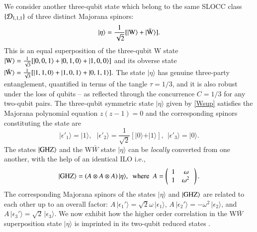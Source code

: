 We consider another three-qubit state which belong to the same SLOCC class $\{{\cal D}_{1,1,1}\}$ of three distinct Majorana spinors: 
\begin{equation}
\vert \eta\rangle = \frac{1}{\sqrt{2}} [\vert {\rm W}\rangle +  \vert{\rm \bar{W}}\rangle].\label{Wsup}
\end{equation}         
This  is an equal superposition of the three-qubit W state $\vert{\rm W}\rangle=\break\frac{1}{\sqrt{3}}[\vert 0,0,1\rangle+\vert 0,1,0\rangle+\vert 1,0,0\rangle]$  
 and its obverse state $\vert{\rm \bar{W}}\rangle=\frac{1}{\sqrt{3}}[\vert 1,1,0\rangle+\vert 1,0,1\rangle+\vert 0,1,1\rangle].$ The state $\vert \eta\rangle$ has genuine three-party entanglement, quantified in terms of the tangle $\tau=1/3$, and it is also robust under the loss of qubits -- as reflected through the concurrence $C=1/3$ for any two-qubit pairs.  The three-qubit symmetric state $\vert \eta\rangle$ given by \eqref{Wsup} satisfies the Majorana polynomial equation $z(z-1)=0$  and the corresponding spinors constituting the state are 
\begin{equation}
\vert \epsilon'_1\rangle =\vert 1\rangle,\ \ \  \vert \epsilon'_2\rangle =\frac{1}{\sqrt{2}}[\vert 0\rangle+ \vert 1\rangle], \ \ \vert \epsilon'_3\rangle = \vert 0\rangle. 
\end{equation}
The states $\vert {\rm GHZ}\rangle$ and the W$\bar W$ state $\vert \eta\rangle$   can be {\em locally} converted from one another,  with the help of an identical ILO i.e.,
\begin{equation}
\vert {\rm GHZ}\rangle=\left(A\otimes A\otimes A\right) \vert \eta\rangle,\ \   \mbox{where}\ \ A=\left(\begin{array}{cc} 1 & \omega \\ 1 & \omega^2\, \end{array}\right).\label{GHZ&eta}
\end{equation}
The corresponding Majorana spinors  of the states $\vert \eta\rangle$ and $\vert{\rm GHZ}\rangle$ are  related to each other up to an overall factor: $A\, \vert\epsilon_1'\rangle=\sqrt{2}\omega\, \vert\epsilon_1\rangle$, $A\, \vert\epsilon_2'\rangle=-\omega^2\, \vert\epsilon_2\rangle$, and $A\, \vert\epsilon_3'\rangle=   \sqrt{2}\,  \vert\epsilon_3\rangle$. We now exhibit how the higher order correlation in  the W$\bar W$ superposition state $\vert \eta\rangle$ is imprinted in its two-qubit reduced states \cite{SP1,usa,usa1,usa2}. 


